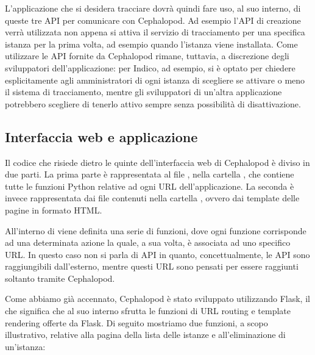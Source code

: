             L'applicazione che si desidera tracciare dovrà quindi fare uso, al suo interno, di queste tre \ac{API} per comunicare con Cephalopod. Ad esempio l'\ac{API} di creazione verrà utilizzata non appena si attiva il servizio di tracciamento per una specifica istanza per la prima volta, ad esempio quando l'istanza viene installata. Come utilizzare le \ac{API} fornite da Cephalopod rimane, tuttavia, a discrezione degli sviluppatori dell'applicazione: per Indico, ad esempio, si è optato per chiedere esplicitamente agli amministratori di ogni istanza di scegliere se attivare o meno il sistema di tracciamento, mentre gli sviluppatori di un'altra applicazione potrebbero scegliere di tenerlo attivo sempre senza possibilità di disattivazione.
        
        \subsection{Interfaccia web e applicazione} \label{subsec:it;di;interfaccia_web_applicazione}
        
            Il codice che risiede dietro le quinte dell'interfaccia web di Cephalopod è diviso in due parti. La prima parte è rappresentata al file , nella cartella , che contiene tutte le funzioni Python relative ad ogni \ac{URL} dell'applicazione. La seconda è invece rappresentata dai file contenuti nella cartella , ovvero dai template delle pagine in formato \ac{HTML}.
            
            All'interno di  viene definita una serie di funzioni, dove ogni funzione corrisponde ad una determinata azione la quale, a sua volta, è associata ad uno specifico \ac{URL}. In questo caso non si parla di \ac{API} in quanto, concettualmente, le \ac{API} sono raggiungibili dall'esterno, mentre questi \ac{URL} sono pensati per essere raggiunti soltanto tramite Cephalopod.
            
            Come abbiamo già accennato, Cephalopod è stato sviluppato utilizzando Flask, il che significa che al suo interno sfrutta le funzioni di \ac{URL} routing e template rendering offerte da Flask. Di seguito mostriamo due funzioni, a scopo illustrativo, relative alla pagina della lista delle istanze e all'eliminazione di un'istanza:
            
